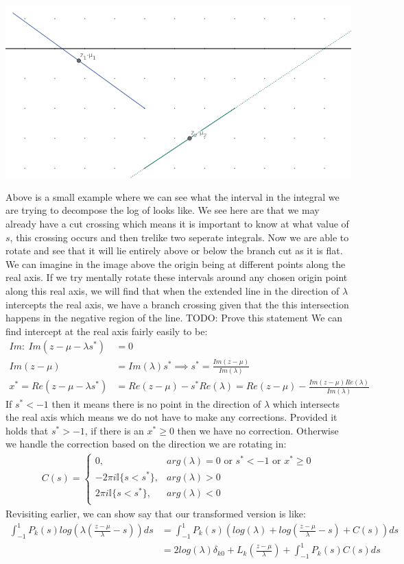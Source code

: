 \documentclass{article}
\begin{document}
\includegraphics[width=\textwidth]{intervaltransform}

Above is a small example where we can see what the interval in the integral we are trying to decompose the log of looks like.
We see here are that we may already have a cut crossing which means it is important to know at what value of $s$, this crossing occurs and then trelike two seperate integrals.
Now we are able to rotate and see that it will lie entirely above or below the branch cut as it is flat.
We can imagine in the image above the origin being at different points along the real axis.
If we try mentally rotate these intervals around any chosen origin point along this real axis, we will find that when the extended line in the direction of $\lambda$ intercepts the real axis, we have a branch crossing given that the this intersection happens in the negative region of the line.
TODO: Prove this statement
We can find intercept at the real axis fairly easily to be:
\begin{align}
    Im:\:Im(z-\mu-\lambda s^*)&=0\\
    Im(z-\mu)&=Im(\lambda)s^*\implies s^*=\frac{Im(z-\mu)}{Im(\lambda)}\\
    x^*=Re(z-\mu-\lambda s^*)&=Re(z-\mu)-s^*Re(\lambda)=Re(z-\mu)-\frac{Im(z-\mu)Re(\lambda)}{Im(\lambda)}
\end{align}
If $s^*<-1$ then it means there is no point in the direction of $\lambda$ which intersects the real axis which means we do not have to make any corrections.
Provided it holds that $s^*>-1$, if there is an $x^*\geq 0$ then we have no correction.
Otherwise we handle the correction based on the direction we are rotating in:
\begin{align}
    C(s)=\begin{cases}
	0,&arg(\lambda)=0\text{ or }s^*<-1\text{ or }x^*\geq 0\\
	-2\pi i\mathbb{I}\{s<s^*\},&arg(\lambda)>0\\
	2\pi i\mathbb{I}\{s<s^*\},&arg(\lambda)<0\\
    \end{cases}
\end{align}
Revisiting earlier, we can show say that our transformed version is like:
\begin{align}
    \int_{-1}^1P_k(s)log(\lambda(\frac{z-\mu}{\lambda}-s))ds&=\int_{-1}^1P_k(s)(log(\lambda)+log(\frac{z-\mu}{\lambda}-s)+C(s))ds\\
    &=2log(\lambda)\delta_{k0}+L_k(\frac{z-\mu}{\lambda})+\int_{-1}^1P_k(s)C(s)ds
\end{align}
\end{document}
